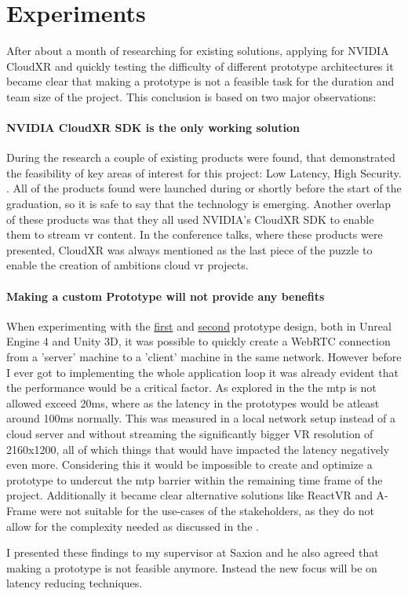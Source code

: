 \section{Experiments}

After about a month of researching for existing solutions, applying for NVIDIA CloudXR and quickly testing the difficulty of different prototype architectures it became clear that making a prototype is not a feasible task for the duration and team size of the project. This conclusion is based on two major observations:

\paragraph{NVIDIA CloudXR SDK is the only working solution}
During the research a couple of existing products were found, that demonstrated the feasibility of key areas of interest for this project: Low Latency, High Security. \parencite{gtc2020esi}. All of the products found were launched during or shortly before the start of the graduation, so it is safe to say that the technology is emerging. Another overlap of these products was that they all used NVIDIA's CloudXR SDK to enable them to stream \acrshort{vr} content. In the conference talks, where these products were presented, CloudXR was always mentioned as the last piece of the puzzle to enable the creation of ambitions cloud \acrshort{vr} projects.

\paragraph{Making a custom Prototype will not provide any benefits}
When experimenting with the \hyperref[fig:pr11]{first} and \hyperref[fig:pr12]{second} prototype design, both in Unreal Engine 4 and Unity 3D, it was possible to quickly create a WebRTC connection from a 'server' machine to a 'client' machine in the same network. However before I ever got to implementing the whole application loop it was already evident that the performance would be a critical factor. As explored in the  the \acrfull{mtp} is not allowed exceed 20\acrshort{ms}, where as the latency in the prototypes would be atleast around 100\acrshort{ms} normally. This was measured in a local network setup instead of a cloud server and without streaming the significantly bigger VR resolution of 2160x1200, all of which things that would have impacted the latency negatively even more. Considering this it would be impossible to create and optimize a prototype to undercut the \acrshort{mtp} barrier within the remaining time frame of the project. Additionally it became clear alternative solutions like ReactVR \parencite{reactVR} and A-Frame \parencite{aframe} were not suitable for the use-cases of the stakeholders, as they do not allow for the complexity needed as discussed in the . 

I presented these findings to my supervisor at Saxion and he also agreed that making a prototype is not feasible anymore. Instead the new focus will be on latency reducing techniques.